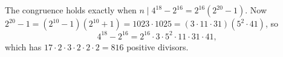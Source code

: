 The congruence holds exactly when $n\mid4^{18}-2^{16}=2^{16}\left(2^{20}-1\right)$. Now $2^{20}-1=\left(2^{10}-1\right)\left(2^{10}+1\right)=1023\cdot1025=(3\cdot11\cdot31)\left(5^2\cdot41\right)$, so
\[4^{18}-2^{16}=2^{16}\cdot3\cdot5^2\cdot11\cdot31\cdot41,\]
which has $17\cdot2\cdot3\cdot2\cdot2\cdot2=\boxed{816}$ positive divisors.

